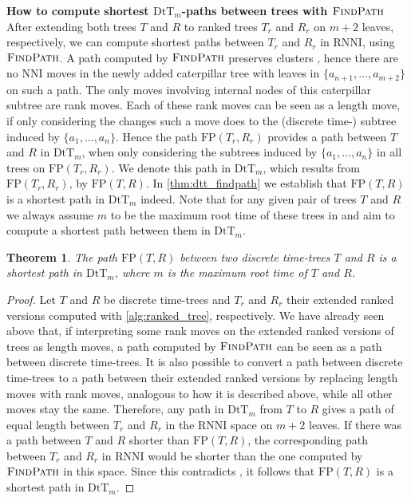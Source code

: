 \documentclass[11pt]{amsart}
\newtheorem{theorem}{Theorem}
\newcommand{\rnni}{\mathrm{RNNI}}
\newcommand{\findpath}{\textsc{FindPath}}
\newcommand{\nni}{\mathrm{NNI}}
\newcommand{\fp}{\mathrm{FP}}
\newcommand{\dtt}{\mathrm{DtT}}
\newcommand{\summary}[1]{\textbf{#1}} %
\begin{document}
\summary{How to compute shortest $\dtt_m$-paths between trees with $\findpath$}
After extending both trees $T$ and $R$ to ranked trees $T_r$ and $R_r$ on $m+2$ leaves, respectively, we can compute shortest paths between $T_r$ and $R_r$ in $\rnni$, using $\findpath$.
A path computed by $\findpath$ preserves clusters \autocite{Collienne2020-iu}, hence there are no $\nni$ moves in the newly added caterpillar tree with leaves in $\{a_{n+1}, \ldots, a_{m+2}\}$ on such a path.
The only moves involving internal nodes of this caterpillar subtree are rank moves.
Each of these rank moves can be seen as a length move, if only considering the changes such a move does to the (discrete time-) subtree induced by $\{a_1, \ldots, a_n\}$.
Hence the path $\fp(T_r,R_r)$ provides a path between $T$ and $R$ in $\dtt_m$, when only considering the subtrees induced by $\{a_1, \ldots, a_n\}$ in all trees on $\fp(T_r, R_r)$.
We denote this path in $\dtt_m$, which results from $\fp(T_r, R_r)$, by $\fp(T,R)$.
In \autoref{thm:dtt_findpath} we establish that $\fp(T,R)$ is a shortest path in $\dtt_m$ indeed.
Note that for any given pair of trees $T$ and $R$ we always assume $m$ to be the maximum root time of these trees in and aim to compute a shortest path between them in $\dtt_m$. 

\begin{theorem}
	The path $\fp(T,R)$ between two discrete time-trees $T$ and $R$ is a shortest path in $\dtt_m$, where $m$ is the maximum root time of $T$ and $R$.
	\label{thm:dtt_findpath}
\end{theorem}

\begin{proof}
	Let $T$ and $R$ be discrete time-trees and $T_r$ and $R_r$ their extended ranked versions computed with \autoref{alg:ranked_tree}, respectively.
	We have already seen above that, if interpreting some rank moves on the extended ranked versions of trees as length moves, a path computed by $\findpath$ can be seen as a path between discrete time-trees.
	It is also possible to convert a path between discrete time-trees to a path between their extended ranked versions by replacing length moves with rank moves, analogous to how it is described above, while all other moves stay the same.
	Therefore, any path in $\dtt_m$ from $T$ to $R$ gives a path of equal length between $T_r$ and $R_r$ in the $\rnni$ space on $m+2$ leaves.
	If there was a path between $T$ and $R$ shorter than $\fp(T,R)$, the corresponding path between $T_r$ and $R_r$ in $\rnni$ would be shorter than the one computed by $\findpath$ in this space.
	Since this contradicts \autocite[Theorem 1]{Collienne2020-iu}, it follows that $\fp(T,R)$ is a shortest path in $\dtt_m$.
\end{proof}
\end{document}

